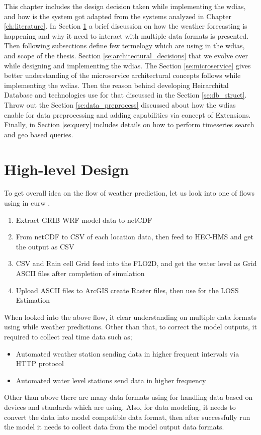 This chapter includes the design decision taken while implementing the \acrfull{wdias}, and how is the system got adapted from the systems analyzed in Chapter \ref{ch:literature}. %
In Section \ref{se:high_level_design} a brief discussion on how the weather forecasting is happening and why it need to interact with multiple data formats is presented. Then following subsections define few termelogy which are using in the \acrshort{wdias}, and scope of the thesis.
Section \ref{se:architectural_decisions} that we evolve over while designing and implementing the \acrshort{wdias}.
The Section \ref{se:microservice} gives better understanding of the microservice architectural concepts follows while implementing the \acrshort{wdias}.
Then the reason behind developing Heirarchital Database and technologies use for that discussed in the Section \ref{se:db_struct}.
Throw out the Section \ref{se:data_preprocess} discussed about how the \acrshort{wdias} enable for data preprocessing and adding capabilities via concept of Extensions.
Finally, in Section \ref{se:query} includes details on how to perform timeseries search and geo based queries.

\section{High-level Design}
\label{se:high_level_design}

To get overall idea on the flow of weather prediction, let us look into one of flows using in \acrshort{curw} \cite{CUrWSL2017SL}.

\begin{enumerate}
    \item Extract GRIB WRF model data to netCDF
    \item From netCDF to CSV of each location data, then feed to HEC-HMS and get the output as CSV
    \item CSV and Rain cell Grid feed into the FLO2D, and get the water level as Grid ASCII files after completion of simulation
    \item Upload ASCII files to ArcGIS create Raster files, then use for the LOSS Estimation
\end{enumerate}
When looked into the above flow, it clear understanding on multiple data formats using while weather predictions.
Other than that, to correct the model outputs, it required to collect real time data such as;
\begin{itemize}
    \item Automated weather station sending data in higher frequent intervals via HTTP protocol
    \item Automated water level stations send data in higher frequency
\end{itemize}
Other than above there are many data formats using for handling data based on devices and standards which are using. Also, for data modeling, it needs to convert the data into model compatible data format, then after successfully run the model it needs to collect data from the model output data formats.

